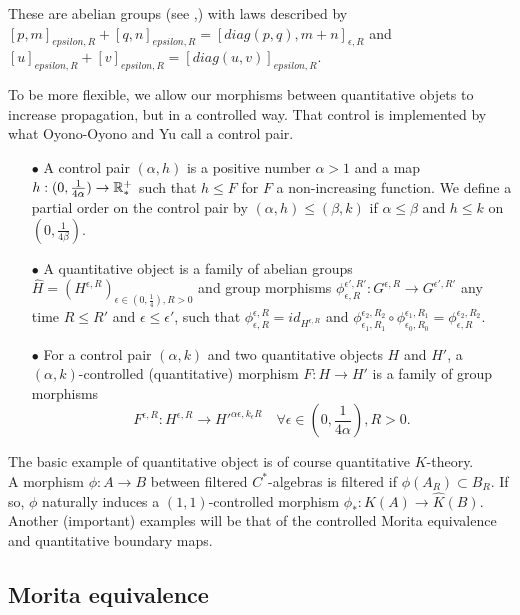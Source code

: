 These are abelian groups (see \cite{OY2},\cite{OY3}) with laws described by $[p,m]_{epsilon,R}+[q,n]_{epsilon,R}=[diag(p,q),m+n]_{\epsilon,R}$ and $[u]_{epsilon,R}+[v]_{epsilon,R}=[diag(u,v)]_{epsilon,R}$.
\begin{definition}
To be more flexible, we allow our morphisms between quantitative objets to increase propagation, but in a controlled way. That control is implemented by what Oyono-Oyono and Yu call a control pair.
\begin{itemize}
\item[$\bullet$] A control pair $(\alpha,h)$ is a positive number $\alpha>1$ and a map $h:(0,\frac{1}{4\alpha})\rightarrow \mathbb R_*^+$ such that $h\leq  F $ for $F$ a non-increasing function. We define a partial order on the control pair by $(\alpha,h)\leq (\beta,k)$ if $\alpha\leq \beta$ and $h\leq k$ on $(0,\frac{1}{4\beta})$.
\item[$\bullet$] A quantitative object is a family of abelian groups $\hat H=(H^{\epsilon,R})_{\epsilon\in(0,\frac{1}{4}),R>0}$ and group morphisms $\phi_{\epsilon,R}^{\epsilon',R'}: G^{\epsilon,R}\rightarrow G^{\epsilon',R'}$ any time $R\leq R'$ and $\epsilon\leq \epsilon'$, such that $\phi_{\epsilon,R}^{\epsilon,R}=id_{H^{\epsilon,R}}$ and $\phi_{\epsilon_1,R_1}^{\epsilon_2,R_2}\circ \phi_{\epsilon_0,R_0}^{\epsilon_1,R_1}=\phi_{\epsilon,R}^{\epsilon_2,R_2}$.
\item[$\bullet$] For a control pair $(\alpha,k)$ and two quantitative objects $H$ and $H'$, a $(\alpha,k)$-controlled (quantitative) morphism $F:H\rightarrow H'$ is a family of group morphisms
\[F^{\epsilon,R}: H^{\epsilon,R}\rightarrow H'^{\alpha\epsilon,k_\epsilon R}\quad\forall \epsilon\in (0,\frac{1}{4\alpha}),R>0.\]
\end{itemize}
\end{definition}

\begin{Expl}
The basic example of quantitative object is of course quantitative $K$-theory.\\
A morphism $\phi : A \rightarrow B$ between filtered $C^*$-algebras is filtered if $\phi(A_R)\subset B_R$. If so, $\phi$ naturally induces a $(1,1)$-controlled morphism $\phi_* : \hat K(A)\rightarrow \hat K(B)$.\\
Another (important) examples will be that of the controlled Morita equivalence and quantitative boundary maps. 
\end{Expl}

\subsection{Morita equivalence}

